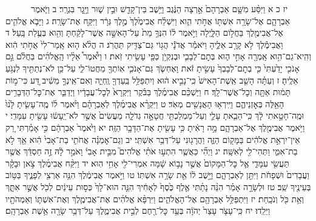 \documentclass[twoside, openany, parskip=half, 11pt]{book}
\begin{document}
　　　יז כ א וַיִּסַּ֨ע מִשָּׁ֤ם אַבְרָהָם֙ אַ֣רְצָה הַנֶּ֔גֶב וַיֵּ֥שֶׁב בֵּין־קָדֵ֖שׁ וּבֵ֣ין שׁ֑וּר וַיָּ֖גׇר בִּגְרָֽר׃ ב וַיֹּ֧אמֶר אַבְרָהָ֛ם אֶל־שָׂרָ֥ה אִשְׁתּ֖וֹ אֲחֹ֣תִי הִ֑וא וַיִּשְׁלַ֗ח אֲבִימֶ֙לֶךְ֙ מֶ֣לֶךְ גְּרָ֔ר וַיִּקַּ֖ח אֶת־שָׂרָֽה׃ ג וַיָּבֹ֧א אֱלֹהִ֛ים אֶל־אֲבִימֶ֖לֶךְ בַּחֲל֣וֹם הַלָּ֑יְלָה וַיֹּ֣אמֶר ל֗וֹ הִנְּךָ֥ מֵת֙ עַל־הָאִשָּׁ֣ה אֲשֶׁר־לָקַ֔חְתָּ וְהִ֖וא בְּעֻ֥לַת בָּֽעַל׃ ד וַאֲבִימֶ֕לֶךְ לֹ֥א קָרַ֖ב אֵלֶ֑יהָ וַיֹּאמַ֕ר אֲדֹנָ֕י הֲג֥וֹי גַּם־צַדִּ֖יק תַּהֲרֹֽג׃ ה הֲלֹ֨א ה֤וּא אָֽמַר־לִי֙ אֲחֹ֣תִי הִ֔וא וְהִֽיא־גַם־הִ֥וא אָֽמְרָ֖ה אָחִ֣י ה֑וּא בְּתׇם־לְבָבִ֛י וּבְנִקְיֹ֥ן כַּפַּ֖י עָשִׂ֥יתִי זֹֽאת׃ ו וַיֹּ֩אמֶר֩ אֵלָ֨יו הָֽאֱלֹהִ֜ים בַּחֲלֹ֗ם גַּ֣ם אָנֹכִ֤י יָדַ֙עְתִּי֙ כִּ֤י בְתׇם־לְבָבְךָ֙ עָשִׂ֣יתָ זֹּ֔את וָאֶחְשֹׂ֧ךְ גַּם־אָנֹכִ֛י אֽוֹתְךָ֖ מֵחֲטוֹ־לִ֑י עַל־כֵּ֥ן לֹא־נְתַתִּ֖יךָ לִנְגֹּ֥עַ אֵלֶֽיהָ׃ ז וְעַתָּ֗ה הָשֵׁ֤ב אֵֽשֶׁת־הָאִישׁ֙ כִּֽי־נָבִ֣יא ה֔וּא וְיִתְפַּלֵּ֥ל בַּֽעַדְךָ֖ וֶֽחְיֵ֑ה וְאִם־אֵֽינְךָ֣ מֵשִׁ֔יב דַּ֚ע כִּי־מ֣וֹת תָּמ֔וּת אַתָּ֖ה וְכׇל־אֲשֶׁר־לָֽךְ׃ ח וַיַּשְׁכֵּ֨ם אֲבִימֶ֜לֶךְ בַּבֹּ֗קֶר וַיִּקְרָא֙ לְכׇל־עֲבָדָ֔יו וַיְדַבֵּ֛ר אֶת־כׇּל־הַדְּבָרִ֥ים הָאֵ֖לֶּה בְּאׇזְנֵיהֶ֑ם וַיִּֽירְא֥וּ הָאֲנָשִׁ֖ים מְאֹֽד׃ ט וַיִּקְרָ֨א אֲבִימֶ֜לֶךְ לְאַבְרָהָ֗ם וַיֹּ֨אמֶר ל֜וֹ מֶֽה־עָשִׂ֤יתָ לָּ֙נוּ֙ וּמֶֽה־חָטָ֣אתִי לָ֔ךְ כִּֽי־הֵבֵ֧אתָ עָלַ֛י וְעַל־מַמְלַכְתִּ֖י חֲטָאָ֣ה גְדֹלָ֑ה מַעֲשִׂים֙ אֲשֶׁ֣ר לֹא־יֵֽעָשׂ֔וּ עָשִׂ֖יתָ עִמָּדִֽי׃ י וַיֹּ֥אמֶר אֲבִימֶ֖לֶךְ אֶל־אַבְרָהָ֑ם מָ֣ה רָאִ֔יתָ כִּ֥י עָשִׂ֖יתָ אֶת־הַדָּבָ֥ר הַזֶּֽה׃ יא וַיֹּ֙אמֶר֙ אַבְרָהָ֔ם כִּ֣י אָמַ֗רְתִּי רַ֚ק אֵין־יִרְאַ֣ת אֱלֹהִ֔ים בַּמָּק֖וֹם הַזֶּ֑ה וַהֲרָג֖וּנִי עַל־דְּבַ֥ר אִשְׁתִּֽי׃ יב וְגַם־אׇמְנָ֗ה אֲחֹתִ֤י בַת־אָבִי֙ הִ֔וא אַ֖ךְ לֹ֣א בַת־אִמִּ֑י וַתְּהִי־לִ֖י לְאִשָּֽׁה׃ יג וַיְהִ֞י כַּאֲשֶׁ֧ר הִתְע֣וּ אֹתִ֗י אֱלֹהִים֮ מִבֵּ֣ית אָבִי֒ וָאֹמַ֣ר לָ֔הּ זֶ֣ה חַסְדֵּ֔ךְ אֲשֶׁ֥ר תַּעֲשִׂ֖י עִמָּדִ֑י אֶ֤ל כׇּל־הַמָּקוֹם֙ אֲשֶׁ֣ר נָב֣וֹא שָׁ֔מָּה אִמְרִי־לִ֖י אָחִ֥י הֽוּא׃ יד וַיִּקַּ֨ח אֲבִימֶ֜לֶךְ צֹ֣אן וּבָקָ֗ר וַעֲבָדִים֙ וּשְׁפָחֹ֔ת וַיִּתֵּ֖ן לְאַבְרָהָ֑ם וַיָּ֣שֶׁב ל֔וֹ אֵ֖ת שָׂרָ֥ה אִשְׁתּֽוֹ׃ טו וַיֹּ֣אמֶר אֲבִימֶ֔לֶךְ הִנֵּ֥ה אַרְצִ֖י לְפָנֶ֑יךָ בַּטּ֥וֹב בְּעֵינֶ֖יךָ שֵֽׁב׃ טז וּלְשָׂרָ֣ה אָמַ֗ר הִנֵּ֨ה נָתַ֜תִּי אֶ֤לֶף כֶּ֙סֶף֙ לְאָחִ֔יךְ הִנֵּ֤ה הוּא־לָךְ֙ כְּס֣וּת עֵינַ֔יִם לְכֹ֖ל אֲשֶׁ֣ר אִתָּ֑ךְ וְאֵ֥ת כֹּ֖ל וְנֹכָֽחַת׃ יז וַיִּתְפַּלֵּ֥ל אַבְרָהָ֖ם אֶל־הָאֱלֹהִ֑ים וַיִּרְפָּ֨א אֱלֹהִ֜ים אֶת־אֲבִימֶ֧לֶךְ וְאֶת־אִשְׁתּ֛וֹ וְאַמְהֹתָ֖יו וַיֵּלֵֽדוּ׃ יח כִּֽי־עָצֹ֤ר עָצַר֙ יְהֹוָ֔ה בְּעַ֥ד כׇּל־רֶ֖חֶם לְבֵ֣ית אֲבִימֶ֑לֶךְ עַל־דְּבַ֥ר שָׂרָ֖ה אֵ֥שֶׁת אַבְרָהָֽם׃
\end{document}
